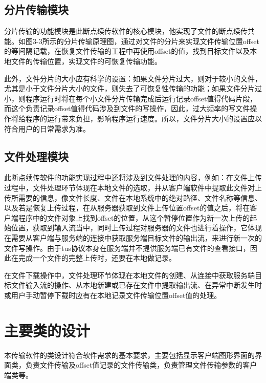 \documentclass[bachelor]{thesis-uestc}
\begin{document}
\subsection{分片传输模块}
分片传输的功能模块是此断点续传软件的核心模块，他实现了文件的断点续传共能。如图3-3所示的分片传输原理图，通过对文件的分片来实现文件传输位置offset的等间隔记载，在恢复文件传输的工程中再使用offset的值，找到目标文件以及本地文件的传输位置，实现文件的可恢复传输功能。
\par 此外，文件分片的大小应有科学的设置：如果文件分片过大，则对于较小的文件，尤其是小于文件分片大小的文件，则失去了可恢复性传输的功能；如果文件分片过小，则程序运行时将在每个小文件分片传输完成后运行记录offset值得代码片段，而这个负责记录offset值得代码涉及到文件的写操作，因此，过大频率的写文件操作将给程序的运行带来负担，影响程序运行速度。所以，文件分片大小的设置应以符合用户的日常需求为准。
\subsection{文件处理模块}
此断点续传软件的功能实现过程中还将涉及到文件处理的内容，例如：在文件上传过程中，文件处理环节体现在本地文件的选取，并从客户端软件中提取此文件对上传所需要的信息，像文件长度、文件在本地系统中的绝对路径、文件名称等信息、以及若是恢复上传过程，在从服务器获取到文件上传位置offset的值之后，将在客户端程序中的文件对象上找到offset的位置，从这个暂停位置作为新一次上传的起始位置，获取到输入流当中，同时上传过程对服务器的文件也进行着操作，它体现在需要从客户端与服务端的连接中获取服务端目标文件的输出流，来进行新一次的文件写操作。由于tus协议本身在服务端并不提供服务端已有文件的查看接口，因此在完成一个文件的完整上传时，还要在本地做记录。
\par 在文件下载操作中，文件处理环节体现在本地文件的创建、从连接中获取服务端目标文件输入流的操作、从本地新建或已存在文件中提取输出流、在异常中断发生时或用户手动暂停下载时应有在本地记录文件传输位置offset值的处理。

\section{主要类的设计}
本传输软件的类设计符合软件需求的基本要求，主要包括显示客户端图形界面的界面类，负责文件传输及offset值记录的文件传输类，负责管理文件传输参数的客户端类等。
\end{document}
